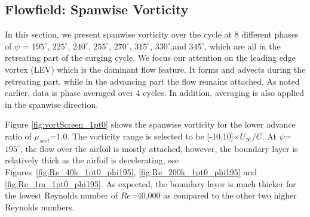 \subsection{Flowfield: Spanwise Vorticity}

In this section, we present spanwise vorticity over the cycle at 8 different phases of $\psi$ = $195^\circ$, $225^\circ$, $240^\circ$, $255^\circ$, $270^\circ$, $315^\circ$, $330^\circ$,and $345^\circ$, which are all in the retreating part of the surging cycle.
We focus our attention on the leading edge vortex (LEV) which is the dominant flow feature.
It forms and advects during the retreating part, while in the advancing part the flow remains attached.
As noted earlier, data is phase averaged over 4 cycles.
In addition, averaging is also applied in the spanwise direction.

Figure \ref{fig:vortScreen_1pt0} shows the spanwise vorticity for the lower advance ratio of $\mu_{sect}$=1.0.
The vorticity range is selected to be [-10,10]$\times U_\infty /C$.
At $\psi$=$195^\circ$, the flow over the airfoil is mostly attached, however, the boundary layer is relatively thick as the airfoil is decelerating, see Figures~\ref{fig:Re_40k_1pt0_phi195}, \ref{fig:Re_200k_1pt0_phi195} and \ref{fig:Re_1m_1pt0_phi195}.
As expected, the boundary layer is much thicker for the lowest Reynolds number of $Re$=40,000 as compared to the other two higher Reynolds numbers.

